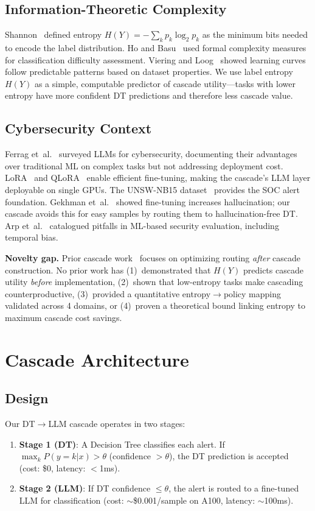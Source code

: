 \documentclass[review,3p]{elsarticle}
\begin{document}
\subsection{Information-Theoretic Complexity}
Shannon~\cite{shannon1948} defined entropy $H(Y) = -\sum_k p_k \log_2 p_k$ as the minimum bits needed to encode the label distribution. Ho and Basu~\cite{ho2002} used formal complexity measures for classification difficulty assessment. Viering and Loog~\cite{viering2023} showed learning curves follow predictable patterns based on dataset properties. We use label entropy $H(Y)$ as a simple, computable predictor of cascade utility---tasks with lower entropy have more confident DT predictions and therefore less cascade value.

\subsection{Cybersecurity Context}
Ferrag et~al.~\cite{ferrag2024} surveyed LLMs for cybersecurity, documenting their advantages over traditional ML on complex tasks but not addressing deployment cost. LoRA~\cite{hu2022} and QLoRA~\cite{dettmers2023} enable efficient fine-tuning, making the cascade's LLM layer deployable on single GPUs. The UNSW-NB15 dataset~\cite{moustafa2016} provides the SOC alert foundation. Gekhman et~al.~\cite{gekhman2024} showed fine-tuning increases hallucination; our cascade avoids this for easy samples by routing them to hallucination-free DT. Arp et~al.~\cite{arp2022} catalogued pitfalls in ML-based security evaluation, including temporal bias.

\textbf{Novelty gap.} Prior cascade work~\cite{viola2001,bolukbasi2017,ong2024} focuses on optimizing routing \emph{after} cascade construction. No prior work has (1)~demonstrated that $H(Y)$ predicts cascade utility \emph{before} implementation, (2)~shown that low-entropy tasks make cascading counterproductive, (3)~provided a quantitative entropy$\to$policy mapping validated across 4 domains, or (4)~proven a theoretical bound linking entropy to maximum cascade cost savings.

\section{Cascade Architecture}

\subsection{Design}
Our DT$\to$LLM cascade operates in two stages:
\begin{enumerate}
\item \textbf{Stage 1 (DT)}: A Decision Tree classifies each alert. If $\max_k P(y=k|x) > \theta$ (confidence $> \theta$), the DT prediction is accepted (cost: \$0, latency: $<$1ms).
\item \textbf{Stage 2 (LLM)}: If DT confidence $\leq \theta$, the alert is routed to a fine-tuned LLM for classification (cost: $\sim$\$0.001/sample on A100, latency: $\sim$100ms).
\end{enumerate}
\end{document}
